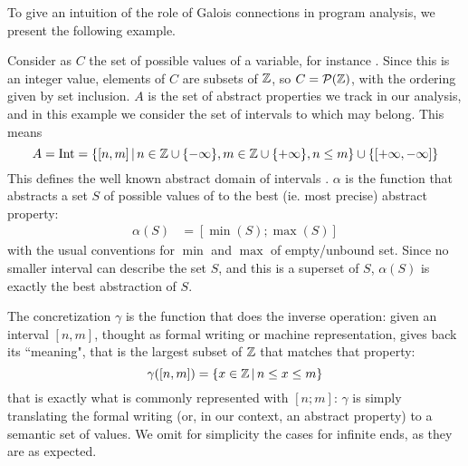 To give an intuition of the role of Galois connections in program analysis, we present the following example.
\begin{example}[Intervals]\label{ex:bg:intervals}
	Consider as $C$ the set of possible values of a variable, for instance . Since this is an integer value, elements of $C$ are subsets of $\mathbb{Z}$, so $C = \mathcal{P}(\mathbb{Z})$, with the ordering given by set inclusion. $A$ is the set of abstract properties we track in our analysis, and in this example we consider the set of intervals to which  may belong. This means
	\[
	A = \text{Int} = \{ [n, m] \,\vert\, n \in \mathbb{Z} \cup \{ -\infty \}, m \in \mathbb{Z} \cup \{ +\infty \}, n \le m \} \cup \{ [+\infty, -\infty] \}
	\]
	This defines the well known abstract domain of intervals \cite{CC77}.
	$\alpha$ is the function that abstracts a set $S$ of possible values of  to the best (ie. most precise) abstract property:
	\begin{align*}
		\alpha(S) & = [\min(S); \max(S)]
	\end{align*}
	with the usual conventions for $\min$ and $\max$ of empty/unbound set.
	Since no smaller interval can describe the set $S$, and this is a superset of $S$, $\alpha(S)$ is exactly the best abstraction of $S$.

	The concretization $\gamma$ is the function that does the inverse operation: given an interval $[n, m]$, thought as formal writing or machine representation, gives back its ``meaning", that is the largest subset of $\mathbb{Z}$ that matches that property:
	\[
	\gamma([n, m]) = \{ x \in \mathbb{Z} \,\vert\, n \le x \le m \}
	\]
	that is exactly what is commonly represented with $[n; m]$: $\gamma$ is simply translating the formal writing (or, in our context, an abstract property) to a semantic set of values.
	We omit for simplicity the cases for infinite ends, as they are as expected.


\end{example}

